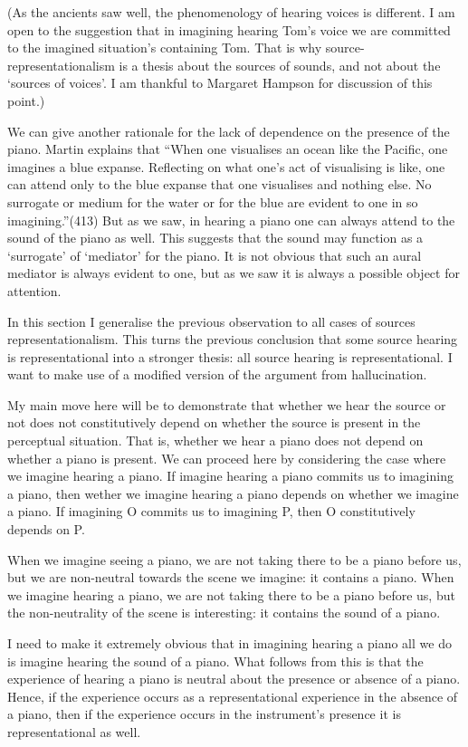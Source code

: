 \documentclass[sloppy, journal, git, bytitle, dodraft]{humapap}
\begin{document}
(As the ancients saw well, the phenomenology of hearing voices is different. I am open to the suggestion that in imagining hearing Tom's voice we are committed to the imagined situation's containing Tom. That is why source-representationalism is a thesis about the sources of sounds, and not about the `sources of voices'. I am thankful to Margaret Hampson for discussion of this point.)

We can give another rationale for the lack of dependence on the presence of the piano. Martin explains that ``When one visualises an ocean like the Pacific, one imagines a blue expanse. Reflecting on what one’s act of visualising is like, one can attend only to the blue expanse that one visualises and nothing else. No surrogate or medium for the water or for the blue are evident to one in so imagining.''(413) But as we saw, in hearing a piano one can always attend to the sound of the piano as well. This suggests that the sound may function as a `surrogate' of `mediator' for the piano. It is not obvious that such an aural mediator is always evident to one, but as we saw it is always a possible object for attention. 


In this section I generalise the previous observation to all cases of sources representationalism. This turns the previous conclusion that some source hearing is representational into a stronger thesis: all source hearing is representational. I want to make use of a modified version of the argument from hallucination. 



My main move here will be to demonstrate that whether we hear the source or not does not constitutively depend on whether the source is present in the perceptual situation. That is, whether we hear a piano does not depend on whether a piano is present. We can proceed here by considering the case where we imagine hearing a piano. If imagine hearing a piano commits us to imagining a piano, then wether we imagine hearing a piano depends on whether we imagine a piano. If imagining O commits us to imagining P, then O constitutively depends on P. 




When we imagine seeing a piano, we are not taking there to be a piano before us, but we are non-neutral towards the scene we imagine: it contains a piano. 
When we imagine hearing a piano, we are not taking there to be a piano before us, but the non-neutrality of the scene is interesting: it contains the sound of a piano. 

I need to make it extremely obvious that in imagining hearing a piano all we do is imagine hearing the sound of a piano. What follows from this is that the experience of hearing a piano is neutral about the presence or absence of a piano. Hence, if the experience occurs as a representational experience in the absence of a piano, then if the experience occurs in the instrument’s presence it is representational as well. 
\end{document}
